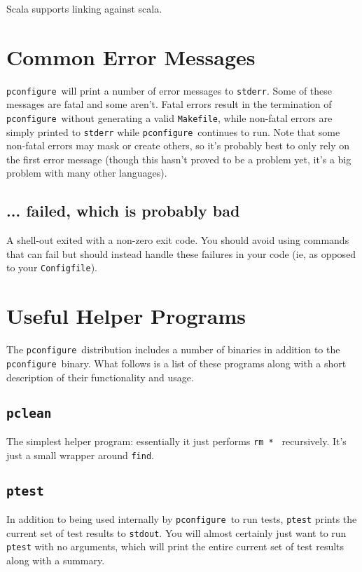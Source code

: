 \documentclass{article}
\newcommand{\pconfigure}{\texttt{pconfigure}}
\begin{document}
Scala supports linking against scala.

\section{Common Error Messages \label{err}}

\pconfigure\ will print a number of error messages to \texttt{stderr}.
Some of these messages are fatal and some aren't.  Fatal errors result
in the termination of \pconfigure\ without generating a valid
\texttt{Makefile}, while non-fatal errors are simply printed to
\texttt{stderr} while \pconfigure\ continues to run.  Note that some
non-fatal errors may mask or create others, so it's probably best to
only rely on the first error message (though this hasn't proved to be
a problem yet, it's a big problem with many other languages). %

\subsection{... failed, which is probably bad}

A shell-out exited with a non-zero exit code.  You should avoid using
commands that can fail but should instead handle these failures in
your code (ie, as opposed to your \texttt{Configfile}).

\section{Useful Helper Programs \label{prog}}

The \pconfigure\ distribution includes a number of binaries in
addition to the \pconfigure\ binary.  What follows is a list of these
programs along with a short description of their functionality and
usage.

\subsection{\texttt{pclean} \label{prog:pclean}}

The simplest helper program: essentially it just performs \texttt{rm
  *~} recursively.  It's just a small wrapper around \texttt{find}.

\subsection{\texttt{ptest} \label{prog:ptest}}

In addition to being used internally by \pconfigure\ to run tests,
\texttt{ptest} prints the current set of test results to
\texttt{stdout}.  You will almost certainly just want to run
\texttt{ptest} with no arguments, which will print the entire current
set of test results along with a summary.
\end{document}
